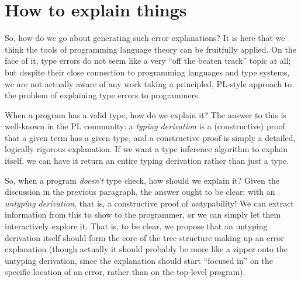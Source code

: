\documentclass[sigplan, screen]{acmart}\settopmatter{printccs=false,printacmref=false}
\begin{document}
\section{How to explain things}

So, how do we go about generating such error explanations?  It is here
that we think the tools of programming language theory can be
fruitfully applied. On the face of it, type errors do not seem like a
very ``off the beaten track'' topic at all; but despite their close
connection to programming languages and type systems, we are not
actually aware of any work taking a principled, PL-style approach to
the problem of explaining type errors to programmers.

When a program has a valid type, how do we explain it?  The answer to
this is well-known in the PL community: a \emph{typing derivation} is
a (constructive) proof that a given term has a given type, and a
constructive proof is simply a detailed, logically
rigorous explanation.  If we want a type inference algorithm to
explain itself, we can have it return an entire typing derivation
rather than just a type.

So, when a program \emph{doesn't} type check, how should we explain
it?  Given the discussion in the previous paragraph, the answer ought
to be clear: with an \emph{untyping derivation}, that is, a
constructive proof of \emph{un}typability!  We can extract information
from this to show to the programmer, or we can simply let them
interactively explore it.  That is, to be clear, we propose that an
untyping derivation itself should form the core of the tree structure
making up an error explanation (though actually it should probably be
more like a zipper onto the untyping derivation, since the explanation
should start ``focused in'' on the specific location of an error,
rather than on the top-level program).
\end{document}
